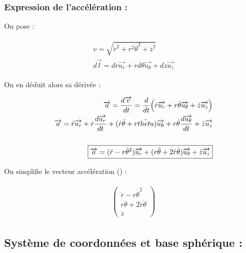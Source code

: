 \documentclass{article}
\begin{document}
\subsubsection*{Expression de l'accélération :}

On pose :

\begin{align*}\begin{split}
v=\sqrt{\dot{r}^2+r^2\dot{\theta}^2+\dot{z}^2}\\
\boxed{d\overrightarrow{l}=dr\overrightarrow{u_r}+rd\theta\overrightarrow{u_\theta}+dz\overrightarrow{u_z}}
\end{split}\end{align*}

On en déduit alors sa dérivée :

\begin{align*}\begin{split}
\overrightarrow{a}=\frac{d\overrightarrow{v}}{dt}=\frac{d}{dt}\Bigl(\dot{r}\overrightarrow{u_r}+r\dot\theta\overrightarrow{u_\theta}+\dot{z}\overrightarrow{u_z}\Bigl)\\
\overrightarrow{a}=\ddot{r}\overrightarrow{u_r}+\dot{r}\frac{d\overrightarrow{u_r}}{dt}+(\dot{r}\dot{\theta}+r\ddot{theta})\overrightarrow{u_\theta}+r\dot{\theta}\frac{d\overrightarrow{u_\theta}}{dt}+\ddot{z}\overrightarrow{u_z}\\\\
\boxed{\overrightarrow{a}=(\ddot{r}-r\dot{\theta}^2)\overrightarrow{u_r}+(r\ddot{\theta}+2\dot{r}\dot{\theta})\overrightarrow{u_\theta}+\ddot{z}\overrightarrow{u_z}}
\end{split}\end{align*}

On simplifie le vecteur accélération () :

\begin{align*}\begin{split}
\left(
\begin{array}{c}
    \ddot{r}-r\dot{\theta}^2\\
    r\ddot{\theta}+2\dot{r}\ddot{\theta}\\
    \ddot{z}
\end{array}
\right)
\end{split}\end{align*}

\subsection{Système de coordonnées et base sphérique :}
\end{document}
